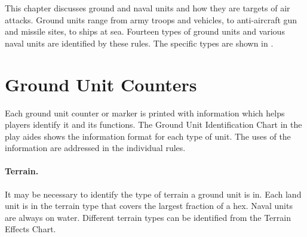 


This chapter discusses ground and naval units and how they are targets of air attacks. Ground units range from army troops and vehicles, to anti-aircraft gun and missile sites, to ships at sea. Fourteen types of ground units and various naval units are identified by these rules. The specific types are shown in .

\section{Ground Unit Counters}

Each ground unit counter or marker is printed with information which helps players identify it and its functions. The Ground Unit Identification Chart in the play aides shows the information format for each type of unit. The uses of the information are addressed in the individual rules.

\paragraph{Terrain.} It may be necessary to identify the type of terrain a ground unit is in. Each land unit is in the terrain type that covers the largest fraction of a hex. Naval units are always on water. Different terrain types can be identified from the Terrain Effects Chart.

